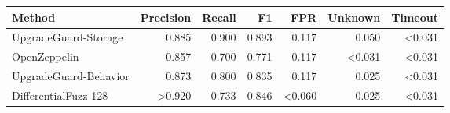 \begin{tabular}{lrrrrrr}
\toprule
Method & Precision & Recall & F1 & FPR & Unknown & Timeout \\
\midrule
UpgradeGuard-Storage & 0.885 & 0.900 & 0.893 & 0.117 & 0.050 & <0.031 \\
OpenZeppelin & 0.857 & 0.700 & 0.771 & 0.117 & <0.031 & <0.031 \\
UpgradeGuard-Behavior & 0.873 & 0.800 & 0.835 & 0.117 & 0.025 & <0.031 \\
DifferentialFuzz-128 & >0.920 & 0.733 & 0.846 & <0.060 & 0.025 & <0.031 \\
\bottomrule
\end{tabular}
